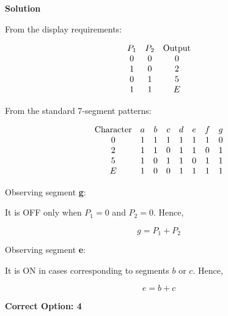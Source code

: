 \documentclass[a4paper,12pt]{article}
\begin{document}
\vspace{0.7cm}

\noindent
\textbf{Solution}

\vspace{0.3cm}

From the display requirements:

\[
\begin{array}{c c c}
P_1 & P_2 & \text{Output} \\
0 & 0 & 0 \\
1 & 0 & 2 \\
0 & 1 & 5 \\
1 & 1 & E
\end{array}
\]

\vspace{0.4cm}

From the standard 7-segment patterns:

\[
\begin{array}{c c c c c c c c}
\text{Character} & a & b & c & d & e & f & g \\
0 & 1 & 1 & 1 & 1 & 1 & 1 & 0 \\
2 & 1 & 1 & 0 & 1 & 1 & 0 & 1 \\
5 & 1 & 0 & 1 & 1 & 0 & 1 & 1 \\
E & 1 & 0 & 0 & 1 & 1 & 1 & 1
\end{array}
\]

\vspace{0.4cm}

Observing segment \textbf{g}:

It is OFF only when $P_1=0$ and $P_2=0$.  
Hence,

\[
g = P_1 + P_2
\]

\vspace{0.4cm}

Observing segment \textbf{e}:

It is ON in cases corresponding to segments $b$ or $c$.  
Hence,

\[
e = b + c
\]

\vspace{0.5cm}

\begin{center}
\textbf{Correct Option: 4}
\end{center}
\end{document}
